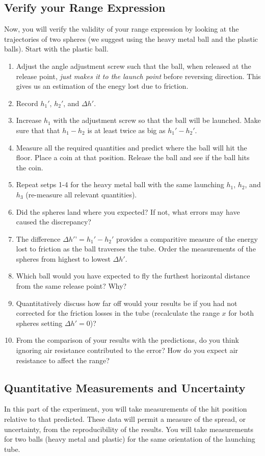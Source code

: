 \subsection{Verify your Range Expression}
Now, you will verify the validity of your range expression by looking at the trajectories of two spheres (we suggest using the heavy metal ball and the plastic balls). Start with the plastic ball.
\begin{enumerate}
\item Adjust the angle adjustment screw such that the ball, when released at the release point, {\it{just makes it to the launch point}} before reversing direction. This gives us an estimation of the enegy lost due to friction.
\item Record $h_1'$, $h_2'$, and $\Delta h'$.
\item Increase $h_1$ with the adjustment screw so that the ball will be launched. Make sure that that $h_1-h_2$ is at least twice as big as $h_1'-h_2'$.
\item Measure all the required quantities and predict where the ball will hit the floor. Place a coin at that position. Release the ball and see if the ball hits the coin.

\item Repeat setps 1-4 for the heavy metal ball with the same launching $h_1$, $h_2$, and $h_3$ (re-measure all relevant quantities).
\item Did the spheres land where you expected? If not, what errors may have caused the discrepancy?
\item The difference $\Delta h'’= h_1' - h_2'$ provides a comparitive measure of the energy lost to friction as the ball traverses the tube. Order the measurements of the spheres from highest to lowest $\Delta h'$.
\item Which ball would you have expected to fly the furthest horizontal distance from the same release point? Why?
\item Quantitatively discuss how far off would your results be if you had not corrected for the friction losses in the tube (recalculate the range $x$ for both spheres setting $\Delta h'=0$)?
\item From the comparison of your results with the predictions, do you think ignoring air resistance contributed to the error? How do you expect air resistance to affect the range?
\end{enumerate}

\subsection{Quantitative Measurements and Uncertainty}
In this part of the experiment, you will take measurements of the hit position relative to that predicted. These data will permit a measure of the spread, or uncertainty, from the reproducibility of the results. You will take measurements for two balls (heavy metal and plastic) for the same orientation of the launching tube.\myskip

